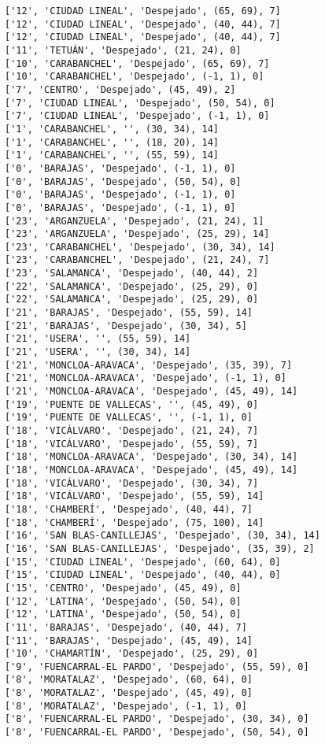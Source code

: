 \documentclass[11pt]{article}
\begin{document}
\begin{Verbatim}[commandchars=\\\{\}]
['12', 'CIUDAD LINEAL', 'Despejado', (65, 69), 7]
['12', 'CIUDAD LINEAL', 'Despejado', (40, 44), 7]
['12', 'CIUDAD LINEAL', 'Despejado', (40, 44), 7]
['11', 'TETUÁN', 'Despejado', (21, 24), 0]
['10', 'CARABANCHEL', 'Despejado', (65, 69), 7]
['10', 'CARABANCHEL', 'Despejado', (-1, 1), 0]
['7', 'CENTRO', 'Despejado', (45, 49), 2]
['7', 'CIUDAD LINEAL', 'Despejado', (50, 54), 0]
['7', 'CIUDAD LINEAL', 'Despejado', (-1, 1), 0]
['1', 'CARABANCHEL', '', (30, 34), 14]
['1', 'CARABANCHEL', '', (18, 20), 14]
['1', 'CARABANCHEL', '', (55, 59), 14]
['0', 'BARAJAS', 'Despejado', (-1, 1), 0]
['0', 'BARAJAS', 'Despejado', (50, 54), 0]
['0', 'BARAJAS', 'Despejado', (-1, 1), 0]
['0', 'BARAJAS', 'Despejado', (-1, 1), 0]
['23', 'ARGANZUELA', 'Despejado', (21, 24), 1]
['23', 'ARGANZUELA', 'Despejado', (25, 29), 14]
['23', 'CARABANCHEL', 'Despejado', (30, 34), 14]
['23', 'CARABANCHEL', 'Despejado', (21, 24), 7]
['23', 'SALAMANCA', 'Despejado', (40, 44), 2]
['22', 'SALAMANCA', 'Despejado', (25, 29), 0]
['22', 'SALAMANCA', 'Despejado', (25, 29), 0]
['21', 'BARAJAS', 'Despejado', (55, 59), 14]
['21', 'BARAJAS', 'Despejado', (30, 34), 5]
['21', 'USERA', '', (55, 59), 14]
['21', 'USERA', '', (30, 34), 14]
['21', 'MONCLOA-ARAVACA', 'Despejado', (35, 39), 7]
['21', 'MONCLOA-ARAVACA', 'Despejado', (-1, 1), 0]
['21', 'MONCLOA-ARAVACA', 'Despejado', (45, 49), 14]
['19', 'PUENTE DE VALLECAS', '', (45, 49), 0]
['19', 'PUENTE DE VALLECAS', '', (-1, 1), 0]
['18', 'VICÁLVARO', 'Despejado', (21, 24), 7]
['18', 'VICÁLVARO', 'Despejado', (55, 59), 7]
['18', 'MONCLOA-ARAVACA', 'Despejado', (30, 34), 14]
['18', 'MONCLOA-ARAVACA', 'Despejado', (45, 49), 14]
['18', 'VICÁLVARO', 'Despejado', (30, 34), 7]
['18', 'VICÁLVARO', 'Despejado', (55, 59), 14]
['18', 'CHAMBERÍ', 'Despejado', (40, 44), 7]
['18', 'CHAMBERÍ', 'Despejado', (75, 100), 14]
['16', 'SAN BLAS-CANILLEJAS', 'Despejado', (30, 34), 14]
['16', 'SAN BLAS-CANILLEJAS', 'Despejado', (35, 39), 2]
['15', 'CIUDAD LINEAL', 'Despejado', (60, 64), 0]
['15', 'CIUDAD LINEAL', 'Despejado', (40, 44), 0]
['15', 'CENTRO', 'Despejado', (45, 49), 0]
['12', 'LATINA', 'Despejado', (50, 54), 0]
['12', 'LATINA', 'Despejado', (50, 54), 0]
['11', 'BARAJAS', 'Despejado', (40, 44), 7]
['11', 'BARAJAS', 'Despejado', (45, 49), 14]
['10', 'CHAMARTÍN', 'Despejado', (25, 29), 0]
['9', 'FUENCARRAL-EL PARDO', 'Despejado', (55, 59), 0]
['8', 'MORATALAZ', 'Despejado', (60, 64), 0]
['8', 'MORATALAZ', 'Despejado', (45, 49), 0]
['8', 'MORATALAZ', 'Despejado', (-1, 1), 0]
['8', 'FUENCARRAL-EL PARDO', 'Despejado', (30, 34), 0]
['8', 'FUENCARRAL-EL PARDO', 'Despejado', (50, 54), 0]

\end{Verbatim}
\end{document}
